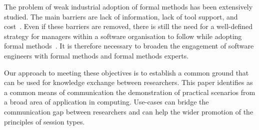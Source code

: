The problem of weak industrial adoption of formal methods
has been extensively studied. The main barriers are lack
of information, lack of tool support, and cost~\cite{Davis2013}.
Even if these barriers are removed, there is still the need for a 
well-defined strategy for managers within a software
organisation to follow while adopting formal methods~\cite{Ponsard2013}.
It is therefore necessary to broaden the engagement of software engineers 
with formal methods and formal methods experts.


Our approach to meeting these objectives is to establish a common
ground that can be used for knowledge exchange between researchers.
This paper identifies as a common means of communication the demonstration
of practical scenarios from a broad area of application in computing.
Use-cases can bridge the communication gap between researchers and can help
the wider promotion of the principles of session types.

